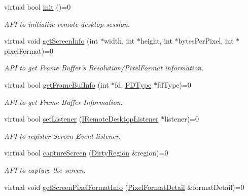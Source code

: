 \begin{DoxyCompactItemize}
\item 
virtual bool \hyperlink{classknoxremotedesktop_1_1IRemoteDesktop_a7bed40d98c61713a69cf1dad8b37beae}{init} ()=0
\begin{DoxyCompactList}\small\item\em \-A\-P\-I to initialize remote desktop session. \end{DoxyCompactList}\item 
virtual void \hyperlink{classknoxremotedesktop_1_1IRemoteDesktop_ae9a1e6863bfc2affad4462bc0a29914a}{get\-Screen\-Info} (int $\ast$width, int $\ast$height, int $\ast$bytes\-Per\-Pixel, int $\ast$pixel\-Format)=0
\begin{DoxyCompactList}\small\item\em \-A\-P\-I to get \-Frame \-Buffer's \-Resolution/\-Pixel\-Format information. \end{DoxyCompactList}\item 
virtual bool \hyperlink{classknoxremotedesktop_1_1IRemoteDesktop_a57d5432823adfd7cfb72441469ccc98e}{get\-Frame\-Buf\-Info} (int $\ast$fd, \hyperlink{namespaceknoxremotedesktop_a01c73ba2fbebc2395aae6198eb87a416}{\-F\-D\-Type} $\ast$fd\-Type)=0
\begin{DoxyCompactList}\small\item\em \-A\-P\-I to get \-Frame \-Buffer \-Information. \end{DoxyCompactList}\item 
virtual bool \hyperlink{classknoxremotedesktop_1_1IRemoteDesktop_af22e75002f52d837cfc9d9589647ddb9}{set\-Listener} (\hyperlink{classknoxremotedesktop_1_1IRemoteDesktopListener}{\-I\-Remote\-Desktop\-Listener} $\ast$listener)=0
\begin{DoxyCompactList}\small\item\em \-A\-P\-I to register \-Screen \-Event listener. \end{DoxyCompactList}\item 
virtual bool \hyperlink{classknoxremotedesktop_1_1IRemoteDesktop_a0ab5a0cf162a91c5e69abeed90f8ba09}{capture\-Screen} (\hyperlink{classknoxremotedesktop_1_1DirtyRegion}{\-Dirty\-Region} \&region)=0
\begin{DoxyCompactList}\small\item\em \-A\-P\-I to capture the screen. \end{DoxyCompactList}\item 
virtual void \hyperlink{classknoxremotedesktop_1_1IRemoteDesktop_a700dee2f575609a933a53d7ab10480e4}{get\-Screen\-Pixel\-Format\-Info} (\hyperlink{structknoxremotedesktop_1_1PixelFormatDetail}{\-Pixel\-Format\-Detail} \&format\-Detail)=0

\end{DoxyCompactItemize}
